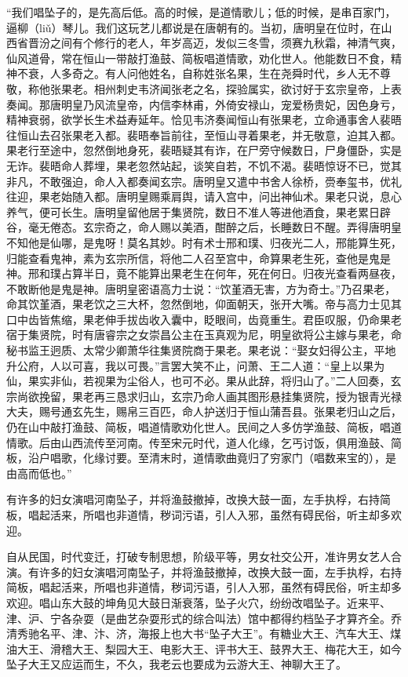 \documentclass[12pt,UTF8]{ctexbook}
\begin{document}
“我们唱坠子的，是先高后低。高的时候，是道情歌儿；低的时候，是串百家门，逼柳（liǔ）琴儿。我们这玩艺儿都说是在唐朝有的。当初，唐明皇在位时，在山西省晋汾之间有个修行的老人，年岁高迈，发似三冬雪，须赛九秋霜，神清气爽，仙风道骨，常在恒山一带敲打渔鼓、简板唱道情歌，劝化世人。他能数日不食，精神不衰，人多奇之。有人问他姓名，自称姓张名果，生在尧舜时代，乡人无不尊敬，称他张果老。相州刺史韦济闻张老之名，探验属实，欲讨好于玄宗皇帝，上表奏闻。那唐明皇乃风流皇帝，内信李林甫，外倚安禄山，宠爱杨贵妃，因色身亏，精神衰弱，欲学长生术益寿延年。恰见韦济奏闻恒山有张果老，立命通事舍人裴晤往恒山去召张果老入都。裴晤奉旨前往，至恒山寻着果老，并无敬意，迫其入都。果老行至途中，忽然倒地身死，裴晤疑其有诈，在尸旁守候数日，尸身僵卧，实是无诈。裴晤命人葬埋，果老忽然站起，谈笑自若，不饥不渴。裴晤惊讶不已，觉其非凡，不敢强迫，命人入都奏闻玄宗。唐明皇又遣中书舍人徐桥，赍奉玺书，优礼往迎，果老始随入都。唐明皇赐乘肩舆，请入宫中，问出神仙术。果老只说，息心养气，便可长生。唐明皇留他居于集贤院，数日不准人等进他酒食，果老累日辟谷，毫无倦态。玄宗奇之，命人赐以美酒，酣醉之后，长睡数日不醒。弄得唐明皇不知他是仙哪，是鬼呀！莫名其妙。时有术士邢和璞、归夜光二人，邢能算生死，归能查看鬼神，素为玄宗所信，将他二人召至宫中，命算果老生死，查他是鬼是神。邢和璞占算半日，竟不能算出果老生在何年，死在何日。归夜光查看两昼夜，不敢断他是鬼是神。唐明皇密语高力士说：“饮堇酒无害，方为奇士。”乃召果老，命其饮堇酒，果老饮之三大杯，忽然倒地，仰面朝天，张开大嘴。帝与高力士见其口中齿皆焦缩，果老伸手拔齿收入囊中，眨眼间，齿竟重生。君臣叹服，仍命果老宿于集贤院，时有唐睿宗之女崇昌公主在玉真观为尼，明皇欲将公主嫁与果老，命秘书监王迥质、太常少卿萧华往集贤院商于果老。果老说：“娶女妇得公主，平地升公府，人以可喜，我以可畏。”言罢大笑不止，问萧、王二人道：“皇上以果为仙，果实非仙，若视果为尘俗人，也可不必。果从此辞，将归山了。”二人回奏，玄宗尚欲挽留，果老再三恳求归山，玄宗乃命人画其图形悬挂集贤院，授为银青光禄大夫，赐号通玄先生，赐帛三百匹，命人护送归于恒山蒲吾县。张果老归山之后，仍在山中敲打渔鼓、简板，唱道情歌劝化世人。民间之人多仿学渔鼓、简板，唱道情歌。后由山西流传至河南。传至宋元时代，道人化缘，乞丐讨饭，俱用渔鼓、简板，沿户唱歌，化缘讨要。至清末时，道情歌曲竟归了穷家门（唱数来宝的），是由高而低也。”

有许多的妇女演唱河南坠子，并将渔鼓撤掉，改换大鼓一面，左手执桴，右持简板，唱起活来，所唱也非道情，秽词污语，引人入邪，虽然有碍民俗，听主却多欢迎。



自从民国，时代变迁，打破专制思想，阶级平等，男女社交公开，准许男女艺人合演。有许多的妇女演唱河南坠子，并将渔鼓撤掉，改换大鼓一面，左手执桴，右持简板，唱起活来，所唱也非道情，秽词污语，引人入邪，虽然有碍民俗，听主却多欢迎。唱山东大鼓的坤角见大鼓日渐衰落，坠子火穴，纷纷改唱坠子。近来平、津、沪、宁各杂耍（是曲艺杂耍形式的综合叫法）馆中都得约档坠子才算齐全。乔清秀驰名平、津、汴、济，海报上也大书“坠子大王”。有糖业大王、汽车大王、煤油大王、滑稽大王、梨园大王、电影大王、评书大王、鼓界大王、梅花大王，如今坠子大王又应运而生，不久，我老云也要成为云游大王、神聊大王了。
\end{document}
